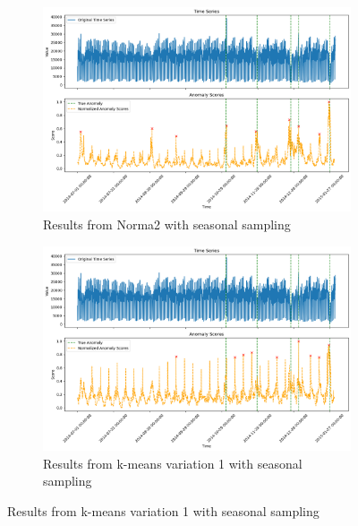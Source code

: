 \documentclass[11pt]{article}
\begin{document}
\begin{figure}[h]
    \begin{subfigure}[b]{0.35\textwidth}
        \includegraphics[width=\textwidth]{algo2.png}
        \caption{Results from Norma2 with seasonal sampling}
        \label{fig:algo2}
    \end{subfigure}

    \begin{subfigure}[b]{0.35\textwidth}
        \includegraphics[width=\textwidth]{algo3.png}
        \caption{Results from k-means variation 1 with seasonal sampling}
        \label{fig:algo3}
    \end{subfigure}


\end{figure}
\end{document}
